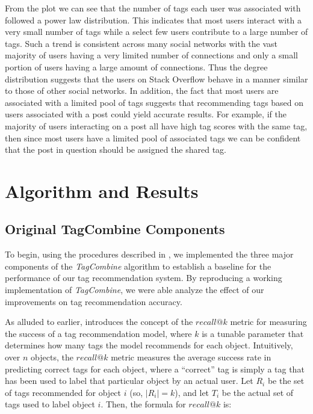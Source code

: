\documentclass[10pt]{IEEEtran}
\begin{document}
From the plot we can see that the number of tags each user was associated with followed a power law distribution. This indicates that most users interact with a very small number of tags while a select few users contribute to a large number of tags. Such a trend is consistent across many social networks with the vast majority of users having a very limited number of connections and only a small portion of users having a large amount of connections. Thus the degree distribution suggests that the users on Stack Overflow behave in a manner similar to those of other social networks. In addition, the fact that most users are associated with a limited pool of tags suggests that recommending tags based on users associated with a post could yield accurate results. For example, if the majority of users interacting on a post all have high tag scores with the same tag, then since most users have a limited pool of associated tags we can be confident that the post in question should be assigned the shared tag.

\section{Algorithm and Results}

\subsection{Original TagCombine Components}

To begin, using the procedures described in \cite{1}, we implemented the three major components of the \textit{TagCombine} algorithm to establish a baseline for the performance of our tag recommendation system. By reproducing a working implementation of \textit{TagCombine}, we were able analyze the effect of our improvements on tag recommendation accuracy.

As alluded to earlier, \cite{1} introduces the concept of the $recall@k$ metric for measuring the success of a tag recommendation model, where $k$ is a tunable parameter that determines how many tags the model recommends for each object. Intuitively, over $n$ objects, the $recall@k$ metric measures the average success rate in predicting correct tags for each object, where a ``correct'' tag is simply a tag that has been used to label that particular object by an actual user. Let $R_i$ be the set of tags recommended for object $i$ (so, $|R_i| = k$), and let $T_i$ be the actual set of tags used to label object $i$. Then, the formula for $recall@k$ is:
\end{document}
